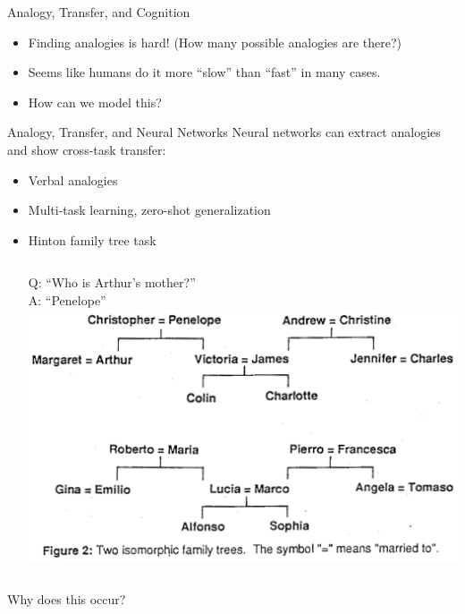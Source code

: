 \documentclass{beamer}
\begin{document}
\begin{frame}{Analogy, Transfer, and Cognition}
\begin{itemize}
    \item<1-> Finding analogies is hard! (How many possible analogies are there?)
    \item<2-> Seems like humans do it more ``slow'' than ``fast'' in many cases. 
    \item<3-> How can we model this?    
\end{itemize}
\end{frame}

\begin{frame}{Analogy, Transfer, and Neural Networks}
Neural networks can extract analogies and show cross-task transfer: 
\begin{itemize}
    \item<2-> Verbal analogies \cite{Kollias2013}
    \item<3-> Multi-task learning, zero-shot generalization \cite{Luong2016,Johnson2016}  
    \item<4-> Hinton family tree task \cite{Hinton1986}
    \begin{columns}
     Q: ``Who is Arthur's mother?'' \\ A: ``Penelope'' %
	\includegraphics[width = \textwidth]{../writing/cogsci_2017/figures/hinton_family_tree_figure.png}
    \end{columns}
\end{itemize}
 {Why does this occur?} %
\end{frame}
\end{document}
